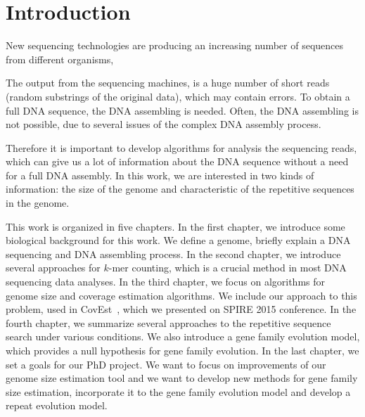 \chapter*{Introduction}
{}

New sequencing technologies are producing an increasing number of sequences from different organisms, 

The output from the sequencing machines, is a huge number of short reads (random substrings of the original data), which may contain  errors. To obtain a full DNA sequence, the DNA assembling is needed. Often, the DNA assembling is not possible, due to several issues of the complex DNA assembly process.

Therefore it is important to develop algorithms for analysis the sequencing reads, which can give us a lot of information about the DNA sequence without a need for a full DNA assembly.
In this work, we are interested in two kinds of information: the size of the genome and characteristic of the repetitive sequences in the genome.

This work is organized in five chapters.
In the first chapter, we introduce some biological background for this work. We define a genome, briefly explain a DNA sequencing and DNA assembling process.
In the second chapter, we introduce several approaches for $k$-mer counting, which is a crucial method in most DNA sequencing data analyses.
In the third chapter, we focus on algorithms for genome size and coverage estimation algorithms. We include our approach to this problem, used in CovEst~\cite{covest}, which we presented on SPIRE 2015 conference.
In the fourth chapter, we summarize several approaches to the repetitive sequence search under various conditions. We also introduce a gene family evolution model, which provides a null hypothesis for gene family evolution.
In the last chapter, we set a goals for our PhD project. We want to focus on improvements of our genome size estimation tool and we want to develop new methods for gene family size estimation, incorporate it to the gene family evolution model and develop a repeat evolution model.
